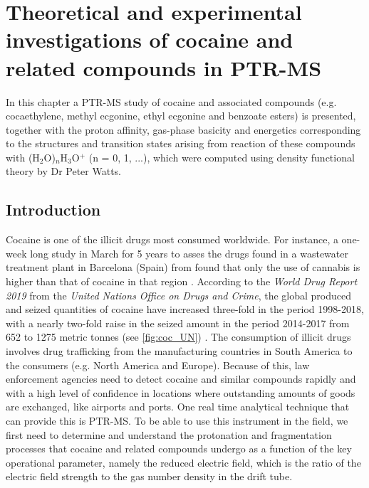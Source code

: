 
\chapter{Theoretical and experimental investigations of cocaine and related compounds in PTR-MS}\label{chapter:cocaine}
 
In this chapter a PTR-MS study of cocaine and associated compounds (e.g. cocaethylene, methyl ecgonine, ethyl ecgonine and benzoate esters) is presented, together with the proton affinity, gas-phase basicity and energetics corresponding to the structures and transition states arising from reaction of these compounds with (H$_2$O)$_n$H$_3$O$^+$ (n = 0, 1, ...), which were computed using density functional theory by Dr Peter Watts.
 
\section{Introduction}


Cocaine is one of the illicit   drugs most consumed  worldwide.
%
For instance, a one-week long study in March  for 5 years to asses the drugs found in a wastewater treatment plant in Barcelona (Spain) from \citeauthor{mastroianni2017five} found that only the use of cannabis is higher than that of cocaine in that region \cite{mastroianni2017five}.
%
According to the \textit{World Drug Report 2019} from the \textit{United Nations Office on Drugs and Crime}, the global produced and seized quantities of cocaine have increased three-fold in the period 1998-2018, with a nearly two-fold raise in the seized amount in the period 2014-2017 from 652 to 1275 metric tonnes (see \autoref{fig:coc_UN})
 \cite{united2019world}.
%
The consumption of illicit drugs involves drug trafficking from the manufacturing countries in South America to the  consumers (e.g. North America and Europe).
%
Because of this, law enforcement agencies need to  detect cocaine and similar compounds rapidly and with a high level of confidence in locations where outstanding amounts of goods are exchanged, like airports and ports. One real time analytical technique that can provide this is PTR-MS.  To be able to use this instrument in the field, we first need to determine and understand the protonation and fragmentation processes that cocaine and related compounds undergo as a function of the key operational parameter, namely the reduced electric field, which is the ratio of the electric field strength to the gas number density in the drift tube.


